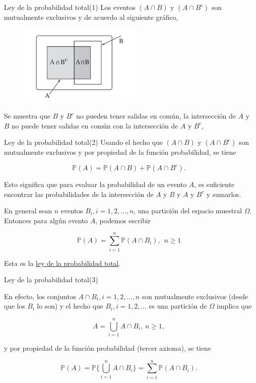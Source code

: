 \documentclass[10pt]{beamer}
\begin{document}
\begin{frame}{Ley de la probabilidad total(1) }
Los eventos $(A \cap B)$ y  $ (A \cap B^c)$ son mutualmente exclusivos y de acuerdo al siguiente gr\'afico, 


\begin{figure}[h]
	\centering
	\includegraphics[width=6cm]{g2}
\end{figure}
Se muestra que $B$ y $B^c$ no pueden tener salidas en com\'un, la intersecci\'on de $A$ y $B$ no puede tener salidas en com\'un con la intersecci\'on de $A$ y $B^c$,	
\end{frame}

\begin{frame}{Ley de la probabilidad total(2)}
Usando el hecho que  $(A \cap B)$ y  $ (A \cap B^c)$ son mutualmente exclusivos y por propiedad de la funci\'on probabilidad, se tiene

\vspace{0.2cm}

\[
\mathbb{P}(A) = \mathbb{P}(A \cap B) + \mathbb{P}(A \cap B^c).
\]


Esto significa que para evaluar la probabilidad de un evento $A$, es suficiente encontrar las probabilidades de la intersecci\'on de $A$ y $B$ y $A$ y $B^c$ y sumarlos. 



En general sean $n$ eventos $B_i, i = 1, 2, \dots, n$, una partici\'on del espacio muestral $\Omega$. Entonces para alg\'un evento $A$, podemos escribir


\[
\mathbb{P}(A) = \sum_{i  =1}^n \mathbb{P}(A \cap B_i), \ \  n \geq 1
\]

Esta es la \underline{ley  de la probabilidad total}.
\end{frame}

\begin{frame}{Ley de la probabilidad total(3)}
	
En efecto, los conjuntos $A \cap B_i, i = 1,2, \dots, n$ son mutualmente exclusivos (desde que los $B_i$ lo son) y el hecho que $B_i, i = 1,2, \dots$ es una partici\'on de $\Omega$ implica que

\[
A = \bigcup_{i =1}^{n}A \cap B_i,\ n \geq 1,
\]

y por propiedad de la funci\'on probabilidad (tercer axioma), se tiene

\vspace{0.2cm}

\[
\mathbb{P}(A) = \mathbb{P}\Biggl\{ \bigcup_{i = 1}^n A \cap B_i \Biggr\} = \sum_{i =1}^{n}\mathbb{P}(A \cap B_i).
\]

\end{frame}
\end{document}
